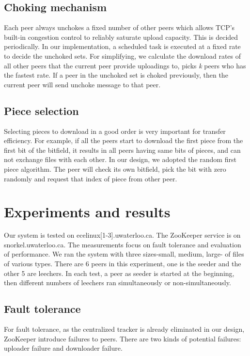 \documentclass[conference]{IEEEtran}
\begin{document}
	\subsection{Choking mechanism}
	Each peer always unchokes a fixed number of other peers which allows TCP's built-in congestion control to reliably saturate upload capacity\cite{BitTorrent}. This is decided periodically. In our implementation, a scheduled task is executed at a fixed rate to decide the unchoked sets. For simplifying, we calculate the download rates of all other peers that the current peer provide uploadings to, picks \emph{k} peers who has the fastest rate. If a peer in the unchoked set is choked previously, then the current peer will send unchoke message to that peer.
	
	\subsection{Piece selection}
	Selecting pieces to download in a good order is very important for transfer efficiency. For example, if all the peers start to download the first piece from the first bit of the bitfield, it results in all peers having same bits of pieces, and can not exchange files with each other. In our design, we adopted the random first piece algorithm. The peer will check its own bitfield, pick the bit with zero randomly and request that index of piece from other peer.
	
	\section{Experiments and results}
Our system is tested on ecelinux[1-3].uwaterloo.ca. The ZooKeeper service is on snorkel.uwaterloo.ca. The measurements focus on fault tolerance and evaluation of performance. We ran the system with three sizes-small, medium, large- of files of various types. There are 6 peers in this experiment, one is the seeder and the other 5 are leechers. In each test, a peer as seeder is started at the beginning, then different numbers of leechers ran simultaneously or non-simultaneously. 
	
	\subsection{Fault tolerance}
	For fault tolerance, as the centralized tracker is already eliminated in our design, ZooKeeper introduce failures to peers. There are two kinds of potential failures: uploader failure and downloader failure.
	
\end{document}
